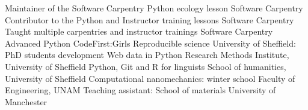 \begin{cvpress}
 \cvpres
 {Maintainer of the Software Carpentry Python ecology lesson}
 {Software Carpentry}
 {}
 \cvpres
 {Contributor to the Python and Instructor training lessons}
 {Software Carpentry}
 {}
 \cvpres
 {Taught multiple carpentries and instructor trainings}
 {Software Carpentry}
 {}
 \cvpres
 {Advanced Python}
 {CodeFirst:Girls}
 {}
 \cvpres
 {Reproducible science}
 {University of Sheffield: PhD students development}
 {}
 \cvpres
 {Web data in Python}
 {Research Methods Institute, University of Sheffield}
 {}
 \cvpres
 {Python, Git and R for linguists}
 {School of humanities, University of Sheffield}
 {}
 \cvpres
 {Computational nanomechanics: winter school}
 {Faculty of Engineering, UNAM}
 {}
 \cvpres
 {Teaching assistant: School of materials}
 {University of Manchester}
 {}
\end{cvpress}